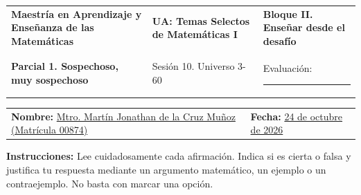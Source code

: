 \documentclass[spanish,letterpaper]{article}
\begin{document}
\color{iiiepeInk}

\noindent
\begin{tabularx}{\textwidth}{@{} >{\raggedright\arraybackslash}p{} >{\centering\arraybackslash}p{} >{\raggedleft\arraybackslash}X @{}}
\textbf{\footnotesize Maestría en Aprendizaje y Enseñanza de las Matemáticas} &
\textbf{\footnotesize UA: Temas Selectos de Matemáticas I} &
\textbf{\footnotesize Bloque II. Enseñar desde el desafío} \\
\footnotesize \textbf{Parcial 1. Sospechoso, muy sospechoso} &
\footnotesize Sesión 10. Universo 3-60 &
\footnotesize Evaluación: \rule{1.8cm}{0.4pt}
\end{tabularx}

\vspace{4pt}
\noindent
\begin{tabularx}{\textwidth}{@{} >{\raggedright\arraybackslash}X >{\raggedleft\arraybackslash}p{} @{}}
\textbf{Nombre:} \underline{\hspace{0.2cm}Mtro. Martín Jonathan de la Cruz Muñoz (Matrícula 00874)\hspace{0.2cm}} &
\textbf{Fecha:} \underline{\hspace{0.2cm}24 de octubre de 2026\hspace{0.2cm}}
\end{tabularx}

\vspace{4pt}
{\small\textbf{Instrucciones:} Lee cuidadosamente cada afirmación. Indica si es cierta o falsa y justifica tu respuesta mediante un argumento matemático, un ejemplo o un contraejemplo. No basta con marcar una opción.}

\vspace{4pt}
\end{document}
